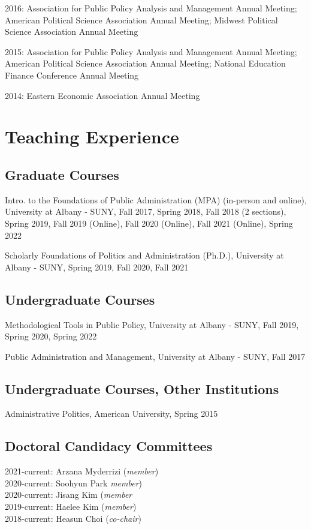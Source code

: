 \documentclass[margin,line]{res}
\begin{document}
\begin{resume}
\begin{hangparas}{.25in}{1}
2016: Association for Public Policy Analysis and Management Annual Meeting; American Political Science Association Annual Meeting; Midwest Political Science Association Annual Meeting

2015: Association for Public Policy Analysis and Management Annual Meeting; American Political Science Association Annual Meeting; National Education Finance Conference Annual Meeting

2014: Eastern Economic Association Annual Meeting
\end{hangparas}

\section{\sc Teaching Experience}
\subsection{\sc Graduate Courses}
\vspace*{-.1in}
Intro. to the Foundations of Public Administration (MPA) (in-person and online), University at Albany - SUNY, Fall 2017, Spring 2018, Fall 2018 (2 sections), Spring 2019, Fall 2019 (Online), Fall 2020 (Online), Fall 2021 (Online), Spring 2022

Scholarly Foundations of Politics and Administration (Ph.D.), University at Albany - SUNY, Spring 2019, Fall 2020, Fall 2021

\vspace*{-.1in}
\subsection{\sc Undergraduate Courses}
\vspace*{-.1in}
Methodological Tools in Public Policy, University at Albany - SUNY, Fall 2019, Spring 2020, Spring 2022

Public Administration and Management, University at Albany - SUNY, Fall 2017

\vspace*{-.1in}
\subsection{\sc Undergraduate Courses, Other Institutions}
\vspace*{-.1in}
Administrative Politics, American University, Spring 2015

\vspace*{-.1in}
\subsection{\sc Doctoral Candidacy Committees}
\vspace*{-.1in}
2021-current: Arzana Myderrizi (\textit{member})\\
2020-current: Soohyun Park \textit{member})\\
2020-current: Jisang Kim (\textit{member}\\
2019-current: Haelee Kim (\textit{member})\\
2018-current: Heasun Choi (\textit{co-chair})\\


\end{resume}
\end{document}
